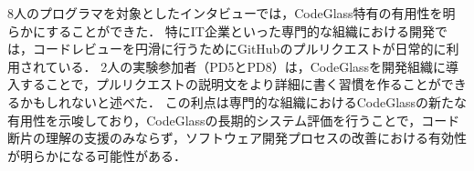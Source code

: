 8人のプログラマを対象としたインタビューでは，CodeGlass特有の有用性を明らかにすることができた．
特にIT企業といった専門的な組織における開発では，コードレビューを円滑に行うためにGitHubのプルリクエストが日常的に利用されている．
2人の実験参加者（PD5とPD8）は，CodeGlassを開発組織に導入することで，プルリクエストの説明文をより詳細に書く習慣を作ることができるかもしれないと述べた．
この利点は専門的な組織におけるCodeGlassの新たな有用性を示唆しており，CodeGlassの長期的システム評価を行うことで，コード断片の理解の支援のみならず，ソフトウェア開発プロセスの改善における有効性が明らかになる可能性がある．


